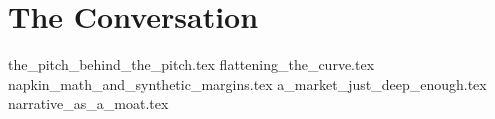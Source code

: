 
\section{The Conversation}


{the_pitch_behind_the_pitch.tex}
{flattening_the_curve.tex}
{napkin_math_and_synthetic_margins.tex}
{a_market_just_deep_enough.tex}
{narrative_as_a_moat.tex}